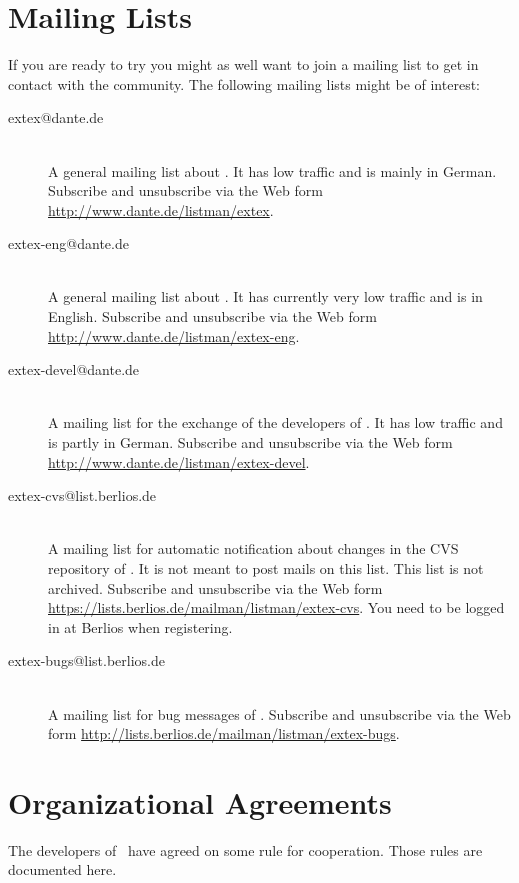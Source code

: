 \section{Mailing Lists}

If you are ready to try \ExTeX{} you might as well want to join a
mailing list to get in contact with the community. The following
mailing lists might be of interest:

\begin{description}
\item[extex@dante.de] \ \\
  A general mailing list about \ExTeX. It has low traffic and is
  mainly in German. Subscribe and unsubscribe via the Web form
  \url{http://www.dante.de/listman/extex}.

\item[extex-eng@dante.de] \ \\
  A general mailing list about \ExTeX. It has currently very low
  traffic and is in English. Subscribe and unsubscribe via the Web
  form \url{http://www.dante.de/listman/extex-eng}.

\item[extex-devel@dante.de] \ \\
  A mailing list for the exchange of the developers of \ExTeX. It has
  low traffic and is partly in German. Subscribe and unsubscribe via
  the Web form \url{http://www.dante.de/listman/extex-devel}.

\item[extex-cvs@list.berlios.de] \ \\
  A mailing list for automatic notification about changes in the CVS
  repository of \ExTeX. It is not meant to post mails on this list.
  This list is not archived. Subscribe and unsubscribe via the Web
  form \url{https://lists.berlios.de/mailman/listman/extex-cvs}. You
  need to be logged in at Berlios when registering.

\item[extex-bugs@list.berlios.de] \ \\
  A mailing list for bug messages of \ExTeX. Subscribe and unsubscribe
  via the Web form
  \url{http://lists.berlios.de/mailman/listman/extex-bugs}.
\end{description}


\section{Organizational Agreements}

The developers of \ExTeX\ have agreed on some rule for cooperation.
Those rules are documented here.

